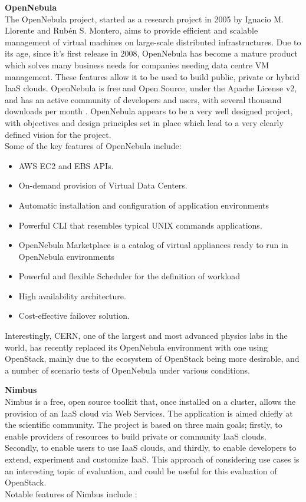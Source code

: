 \textbf{OpenNebula}\\
The OpenNebula project, started as a research project in 2005 by Ignacio M. Llorente and Rubén S. Montero, aims to provide efficient and scalable management of virtual machines on large-scale distributed infrastructures\cite{opennebulaaboutproject}. Due to its age, since it's first release in 2008, OpenNebula has become a mature product which solves many business needs for companies needing data centre VM management. These features allow it to be used to build public, private or hybrid IaaS clouds\cite{opennebulaabouttech}. OpenNebula is free and Open Source, under the Apache License v2, and has an active community of developers and users, with several thousand downloads per month \cite{opennebulaaboutproject}. OpenNebula appears to be a very well designed project, with objectives and design principles set in place which lead to a very clearly defined vision for the project\cite{opennebulaabouttech}.\\
Some of the key features of OpenNebula include\cite{opennebulafeatures}: 

\begin{itemize}
\itemsep0em
\item AWS EC2 and EBS APIs.
\item On-demand provision of Virtual Data Centers.
\item Automatic installation and configuration of application environments 
\item Powerful CLI that resembles typical UNIX commands applications.
\item OpenNebula Marketplace is a catalog of virtual appliances ready to run in OpenNebula environments
\item Powerful and flexible Scheduler for the definition of workload 
\item High availability architecture.
\item Cost-effective failover solution.
\end{itemize}

Interestingly, CERN, one of the largest and most advanced physics labs in the world, has recently replaced its OpenNebula environment with one using OpenStack, mainly due to the ecosystem of OpenStack being more desirable, and a number of scenario tests of OpenNebula under various conditions\cite{cernopennebula}.  

\textbf{Nimbus}\\
Nimbus is a free, open source toolkit that, once installed on a cluster, allows the provision of an IaaS cloud via Web Services. The application is aimed chiefly at the scientific community\cite{nimbusabout}. The project is based on three main goals; firstly, to enable providers of resources to build private or community IaaS clouds. Secondly, to enable users to use IaaS clouds, and thirdly, to enable developers to extend, experiment and customize IaaS\cite{nimbusabout}. This approach of considering use cases is an interesting topic of evaluation, and could be useful for this evaluation of OpenStack. \\
Notable features of Nimbus include \cite{nimbusfeatures}:
 
